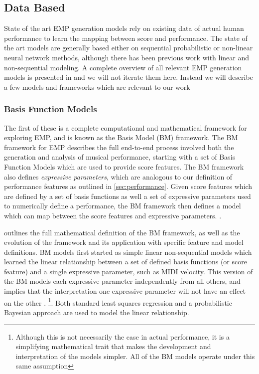 \subsection{Data Based}\label{sec:data-based}
State of the art EMP generation models rely on existing data of actual human performance to learn the mapping between score and performance. The state of the art models are generally based either on sequential probabilistic or non-linear neural network methods\cite{cancino2018computational}, although there has been previous work with linear and non-sequential modeling. A complete overview of all relevant EMP generation models is presented in \cite{cancino2018computational} and we will not iterate them here. Instead we will describe a few models and frameworks which are relevant to our work

\subsubsection{Basis Function Models}
The first of these is a complete computational and mathematical framework for exploring EMP, and is known as the Basis Model (BM) framework\cite{eduardo2018computational}. The BM framework for EMP describes the full end-to-end process involved both the generation and analysis of musical performance, starting with a set of Basis Function Models which are used to provide score features. The BM framework also defines \emph{expressive parameters}, which are analogous to our definition of performance features as outlined in \ref{sec:performance}. Given score features which are defined by a set of basis functions as well a set of expressive parameters used to numerically define a performance, the BM framework then defines a model which can map between the score features and expressive parameters. . 

\citet{eduardo2018computational} outlines the full mathematical definition of the BM framework, as well as the evolution of the framework and its application with specific feature and model definitions. BM models first started as simple linear non-sequential models which learned the linear relationship between a set of defined basis functions (or score feature)  and a single expressive parameter, such as MIDI velocity. This version of the BM models each expressive parameter independently from all others, and implies that the interpretation one expressive parameter will not have an effect on the other . \footnote{Although this is not necessarily the case in actual performance, it is a simplifying mathematical trait that makes the development and interpretation of the models simpler. All of the BM models operate under this same assumption}. Both standard least squares regression and a probabilistic Bayesian approach are used to model the linear relationship. 

